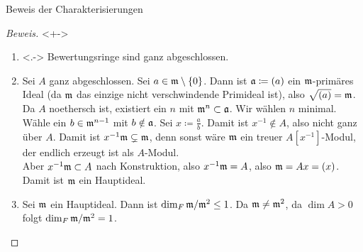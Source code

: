 \begin{frame}{Beweis der Charakterisierungen}
	\begin{proof}[Beweis]<+->
		\renewcommand{\qedsymbol}{}
		\begin{enumerate}[<+->]
		\item<.->
			Bewertungsringe sind ganz abgeschlossen.
		\item
			Sei \(A\) ganz abgeschlossen. Sei \(a \in \mathfrak{m} \setminus \{0\}\). Dann ist \(\mathfrak{a} \coloneqq (a)\)
			ein \(\mathfrak{m}\)-primäres Ideal (da \(\mathfrak{m}\) das einzige nicht verschwindende
			Primideal ist), also \(\sqrt{\mathfrak{(}a)} = \mathfrak{m}\). Da \(A\) noethersch ist,
			existiert ein \(n\) mit \(\mathfrak{m}^n \subset \mathfrak{a}\). Wir wählen \(n\) minimal.
			\\
			Wähle ein \(b \in \mathfrak{m}^{n - 1}\) mit \(b \notin \mathfrak{a}\). Sei \(x \coloneqq \frac a b\).
			Damit ist \(x^{-1} \notin A\), also nicht ganz über \(A\). Damit ist \(x^{-1} \mathfrak{m} \subsetneq \mathfrak{m}\),
			denn sonst wäre \(\mathfrak{m}\) ein treuer \(A[x^{-1}]\)-Modul, der endlich erzeugt ist als \(A\)-Modul.
			\\
			Aber \(x^{-1} \mathfrak{m} \subset A\) nach Konstruktion, also \(x^{-1} \mathfrak{m} = A\), also \(\mathfrak{m} = Ax = (x)\).
			\\
			Damit ist \(\mathfrak{m}\) ein Hauptideal.
		\item
			Sei \(\mathfrak{m}\) ein Hauptideal. Dann ist \(\dim_F \mathfrak{m}/\mathfrak{m}^2 \leq 1\). Da \(\mathfrak{m} \neq \mathfrak{m}^2\),
			da \(\dim A > 0\) folgt \(\dim_F \mathfrak{m}/\mathfrak{m}^2 = 1\).
			\qedhere
		\end{enumerate}
	\end{proof}
\end{frame}

